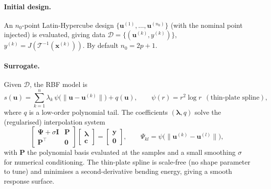 \documentclass[11pt]{article}
\newcommand{\xv}{\bm{x}}
\begin{document}
\paragraph{Initial design.} An $n_0$-point Latin-Hypercube design
\citep{McKay1979} $\{\bm{u}^{(1)},\dots,\bm{u}^{(n_0)}\}$ (with the nominal point
injected) is evaluated, giving data $\mathcal{D}=\{(\bm{u}^{(k)},y^{(k)})\}$,
$y^{(k)}=J(\mathcal{T}^{-1}(\xv^{(k)}))$. By default $n_0=2p+1$.

\paragraph{Surrogate.} Given $\mathcal{D}$, the RBF model is
\begin{equation}
  s(\bm{u})=\sum_{k=1}^{n}\lambda_k\,\psi\big(\lVert\bm{u}-\bm{u}^{(k)}\rVert\big)
  +q(\bm{u}),
  \qquad
  \psi(r)=r^{2}\log r \ \ (\text{thin-plate spline}),
  \label{eq:rbf}
\end{equation}
where $q$ is a low-order polynomial tail. The coefficients $(\bm{\lambda},q)$ solve
the (regularised) interpolation system
\begin{equation}
  \begin{bmatrix} \bm{\Psi}+\sigma\bm{I} & \bm{P}\\ \bm{P}^{\!\top} & \bm{0}\end{bmatrix}
  \begin{bmatrix}\bm{\lambda}\\ \bm{c}\end{bmatrix}
  =\begin{bmatrix}\bm{y}\\ \bm{0}\end{bmatrix},
  \qquad
  \Psi_{kl}=\psi\big(\lVert\bm{u}^{(k)}-\bm{u}^{(l)}\rVert\big),
  \label{eq:rbf-system}
\end{equation}
with $\bm{P}$ the polynomial basis evaluated at the samples and a small smoothing
$\sigma$ for numerical conditioning. The thin-plate spline is scale-free (no shape
parameter to tune) and minimises a second-derivative bending energy, giving a
smooth response surface.
\end{document}

